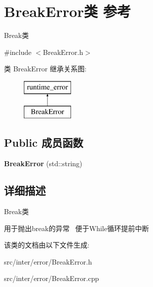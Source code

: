\hypertarget{class_break_error}{}\section{Break\+Error类 参考}
\label{class_break_error}


Break类  




{\ttfamily \#include $<$Break\+Error.\+h$>$}

类 Break\+Error 继承关系图\+:\begin{figure}[H]
\begin{center}
\leavevmode
\includegraphics[height=2.000000cm]{class_break_error}
\end{center}
\end{figure}
\subsection*{Public 成员函数}
\begin{DoxyCompactItemize}
\item 
\mbox{\label{class_break_error_a94dc77c2e9e9088a44b073a9eda03833}} 
{\bfseries Break\+Error} (std\+::string)
\end{DoxyCompactItemize}


\subsection{详细描述}
Break类 

用于抛出break的异常~\newline
便于\+While循环提前中断 

该类的文档由以下文件生成\+:\begin{DoxyCompactItemize}
\item 
src/inter/error/Break\+Error.\+h\item 
src/inter/error/Break\+Error.\+cpp\end{DoxyCompactItemize}
